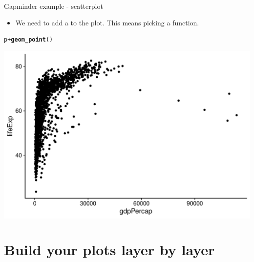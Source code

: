 \documentclass[10pt,handout]{beamer}\usepackage[]{graphicx}\usepackage[]{color}
\makeatletter
\def\maxwidth{ %
  \ifdim\Gin@nat@width>\linewidth
    \linewidth
  \else
    \Gin@nat@width
  \fi
}
\newcommand{\hlopt}[1]{\textcolor[rgb]{0,0,0}{#1}}%
\newcommand{\hlstd}[1]{\textcolor[rgb]{0.345,0.345,0.345}{#1}}%
\newcommand{\hlkwd}[1]{\textcolor[rgb]{0.737,0.353,0.396}{\textbf{#1}}}%
\newenvironment{kframe}{%
 \def\at@end@of@kframe{}%
 \ifinner\ifhmode%
  \def\at@end@of@kframe{\end{minipage}}%
  \begin{minipage}{\columnwidth}%
 \fi\fi%
 \def\FrameCommand##1{\hskip\@totalleftmargin \hskip-\fboxsep
 \colorbox{shadecolor}{##1}\hskip-\fboxsep
     \hskip-\linewidth \hskip-\@totalleftmargin \hskip\columnwidth}%
 \MakeFramed {\advance\hsize-\width
   \@totalleftmargin\z@ \linewidth\hsize
   \@setminipage}}%
 {\par\unskip\endMakeFramed%
 \at@end@of@kframe}
\newenvironment{knitrout}{}{} %
\makeatother
\begin{document}
\begin{frame}[fragile]{Gapminder example - scatterplot}
	
	\begin{itemize}
		\item We need to add a  to the plot. This means picking a  function.
	\end{itemize}
	

\begin{knitrout}\tiny
{}\color{fgcolor}\begin{kframe}
\begin{alltt}
\hlstd{p} \hlopt{+} \hlkwd{geom_point}\hlstd{()}
\end{alltt}
\end{kframe}

{\centering \includegraphics[width=\maxwidth]{figure/unnamed-chunk-6-1} 

}


\end{knitrout}
	
\end{frame}



\section{Build your plots layer by layer}
\end{document}
